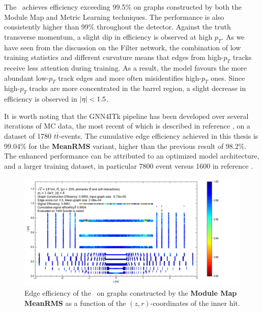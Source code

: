 The \ignn~achieves efficiency exceeding 99.5\% on graphs constructed by both the Module Map and Metric Learning techniques.
The performance is also consistently higher than 99\% throughout the detector.
Against the truth transverse momentum, a slight dip in efficiency is observed at high $p_T$.
As we have seen from the discussion on the Filter network, the combination of low training statistics and different curvature means that edges from high-$p_T$ tracks receive less attention during training. 
As a result, the model favours the more abundant low-$p_T$ track edges and more often misidentifies high-$p_T$ ones.
Since high-$p_T$ tracks are more concentrated in the barrel region, a slight decrease in efficiency is observed in $\abs{\eta}<1.5$.

It is worth noting that the GNN4ITk pipeline has been developed over several iterations of MC data, the most recent of which is described in reference \cite{ctd23-gnn4itk}, on a dataset of 1780 $t\bar{t}$-events.
The cumulative edge efficiency achieved in this thesis is 99.04\% for the \textbf{MeanRMS} variant, higher than the previous result of 98.2\%.
The enhanced performance can be attributed to an optimized model architecture, and a larger training dataset, in particular 7800 event versus 1600 in reference \cite{ctd23-gnn4itk}. 

\begin{figure}[h!]
    \centering
    \includegraphics[width=\textwidth, trim={0cm 0 2.85cm 0}, clip]{figures/gnn-meanrms/gnn_MM_UNCLEANED_MEANRMS_WITHOUT_CONCAT_LATENT128_LN/cumulative_gnn_edgewise_eff_rz_check.png}
    \caption{Edge efficiency of the \ignn~on graphs constructed by the \textbf{Module Map MeanRMS} as a function of the $(z,r)$-coordinates of the inner hit.}
    \label{fig:gnn-eff-rz}
\end{figure}

